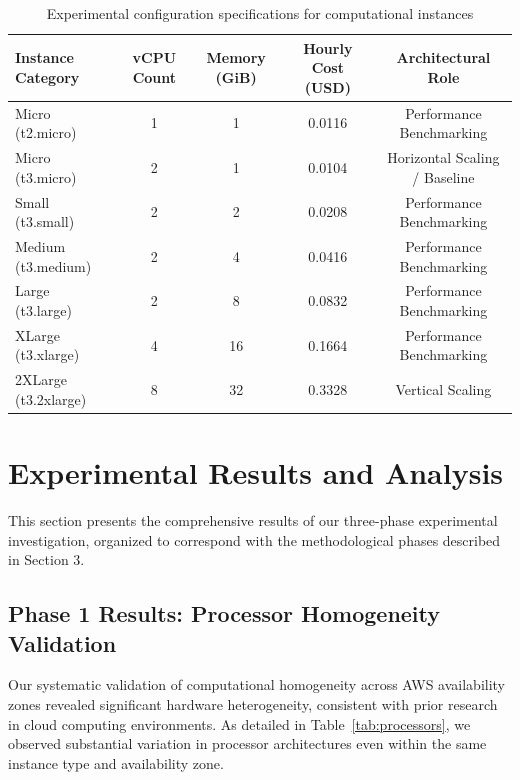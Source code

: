 \documentclass[conference]{IEEEtran}
\begin{document}
	\begin{table}[t]
		\centering
		\caption{Experimental configuration specifications for computational instances}
		\label{tab:experimental_configurations}
		\begin{tabular}{|l|c|c|c|c|}
			\hline
			\textbf{Instance Category} & \textbf{vCPU Count} & \textbf{Memory (GiB)} & \textbf{Hourly Cost (USD)} & \textbf{Architectural Role} \\
			\hline
			Micro (t2.micro) & 1 & 1     & 0.0116  & Performance Benchmarking                     \\
			\hline
			Micro (t3.micro) & 2 & 1 & 0.0104 & Horizontal Scaling / Baseline \\
			\hline
			Small (t3.small) & 2 & 2 & 0.0208 & Performance Benchmarking \\
			\hline
			Medium (t3.medium) & 2 & 4 & 0.0416 & Performance Benchmarking \\
			\hline
			Large (t3.large) & 2 & 8 & 0.0832 & Performance Benchmarking \\
			\hline
			XLarge (t3.xlarge) & 4 & 16 & 0.1664 & Performance Benchmarking \\
			\hline
			2XLarge (t3.2xlarge) & 8 & 32 & 0.3328 & Vertical Scaling \\
			\hline
		\end{tabular}
	\end{table}
	
	\section{Experimental Results and Analysis}
	\label{experiments}
	
	This section presents the comprehensive results of our three-phase experimental investigation, organized to correspond with the methodological phases described in Section 3.
	
	\subsection{Phase 1 Results: Processor Homogeneity Validation}
	\label{results-phase1}
	
	Our systematic validation of computational homogeneity across AWS availability zones revealed significant hardware heterogeneity, consistent with prior research in cloud computing environments. As detailed in Table~\ref{tab:processors}, we observed substantial variation in processor architectures even within the same instance type and availability zone.
	
\end{document}
